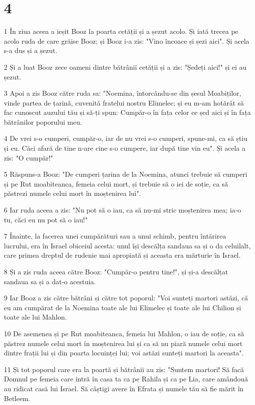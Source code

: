 \chapter{4}

\par 1 În ziua aceea a ieșit Booz la poarta cetății și a șezut acolo. Și iată trecea pe acolo ruda de care grăise Booz; și Booz i-a zis: "Vino încoace și șezi aici". Și acela s-a dus și a șezut.
\par 2 Și a luat Booz zece oameni dintre bătrânii cetății și a zis: "Ședeți aici!" și ei au șezut.
\par 3 Apoi a zis Booz către ruda sa: "Noemina, întorcându-se din șesul Moabiților, vinde partea de țarină, cuvenită fratelui nostru Elimelec; și eu m-am hotărât să fac cunoscut auzului tău și să-ți spun: Cumpăr-o în fața celor ce șed aici și în fața bătrânilor poporului meu.
\par 4 De vrei s-o cumperi, cumpăr-o, iar de nu vrei s-o cumperi, spune-mi, ca să știu și eu. Căci afară de tine n-are cine s-o cumpere, iar după tine vin eu". Și acela a zis: "O cumpăr!"
\par 5 Răspuns-a Booz: "De cumperi țarina de la Noemina, atunci trebuie să cumperi și pe Rut moabiteanca, femeia celui mort, și trebuie să o iei de soție, ca să păstrezi numele celui mort în moștenirea lui".
\par 6 Iar ruda aceea a zis: "Nu pot să o iau, ca să nu-mi stric moștenirea mea; ia-o tu, căci eu nu pot să o iau!"
\par 7 Înainte, la facerea unei cumpărături sau a unui schimb, pentru întărirea lucrului, era în Israel obiceiul acesta: unul își descălța sandaua sa și o da celuilalt, care primea dreptul de rudenie mai apropiată și aceasta era mărturie în Israel.
\par 8 Și a zis ruda aceea către Booz: "Cumpăr-o pentru tine!", și și-a descălțat sandaua sa și a dat-o acestuia.
\par 9 Iar Booz a zis către bătrâni și către tot poporul: "Voi sunteți martori astăzi, că eu am cumpărat de la Noemina toate ale lui Elimelec și toate ale lui Chilion și toate ale lui Mahlon.
\par 10 De asemenea și pe Rut moabiteanca, femeia lui Mahlon, o iau de soție, ca să păstrez numele celui mort în moștenirea lui și ca să nu piară numele celui mort dintre frații lui și din poarta locuinței lui; voi astăzi sunteți martori la aceasta".
\par 11 Și tot poporul care era la poartă și bătrânii au zis: "Suntem martori! Să facă Domnul pe femeia care intră în casa ta ca pe Rahila și ca pe Lia, care amândouă au ridicat casă lui Israel. Să câștigi avere în Efrata și numele tău să fie mărit în Betleem.
